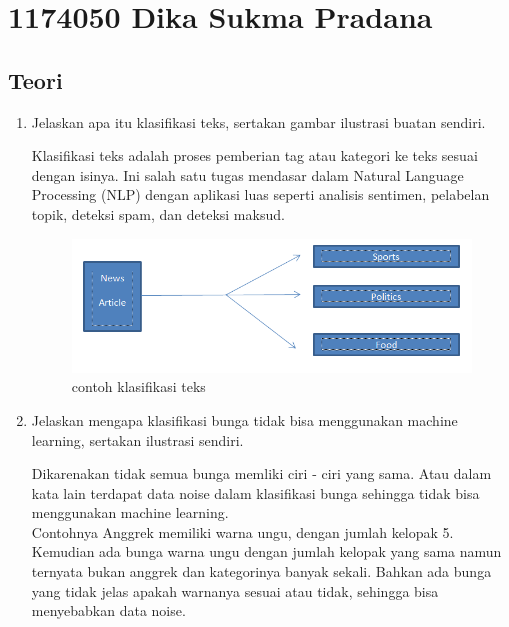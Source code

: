 \section{1174050 Dika Sukma Pradana}

\subsection{Teori}
\begin{enumerate}
\item Jelaskan apa itu klasifikasi teks, sertakan gambar ilustrasi buatan sendiri.\par
Klasifikasi teks adalah proses pemberian tag atau kategori ke teks sesuai dengan isinya. Ini salah satu tugas mendasar dalam Natural Language Processing (NLP) dengan aplikasi luas seperti analisis sentimen, pelabelan topik, deteksi spam, dan deteksi maksud.

\begin{figure}[ht]
\centering
\includegraphics[scale=0.2]{figures/1174050/chapter4/1.PNG}
\caption{contoh klasifikasi teks}
\label{contoh}
\end{figure}

\item Jelaskan mengapa klasifikasi bunga tidak bisa menggunakan machine learning, sertakan ilustrasi sendiri.\par
Dikarenakan tidak semua bunga memliki ciri - ciri yang sama. Atau dalam kata lain terdapat data noise dalam klasifikasi bunga sehingga tidak bisa menggunakan machine learning.\\
Contohnya Anggrek memiliki warna ungu, dengan jumlah kelopak 5. Kemudian ada bunga warna ungu dengan jumlah kelopak yang sama namun ternyata bukan anggrek dan kategorinya banyak sekali. Bahkan ada bunga yang tidak jelas apakah warnanya sesuai atau tidak, sehingga bisa menyebabkan data noise. 


\end{enumerate}
